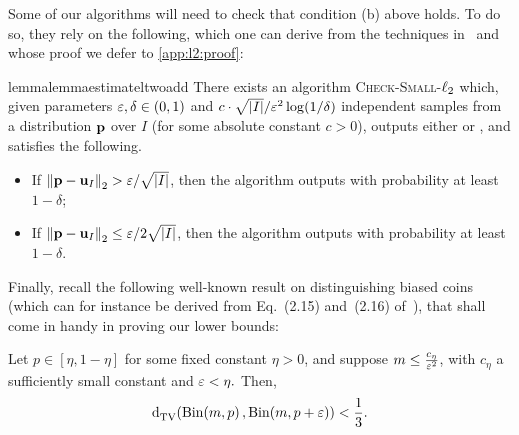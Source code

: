 \noindent Some of our algorithms will need to check that condition \textsf{(b)} above holds. To do so, they rely on the following, which one can derive from the techniques in~\cite{DKN:15} and whose proof we defer to \cref{app:l2:proof}:
\begin{restatable}{lemma}{lemmaestimateltwoadd}\label{lemma:estimate:l2:add}
There exists an algorithm \textsc{Check-Small-$\lp[2]$} which, given parameters $\eps,\delta\in(0,1)$ and $c\cdot{\sqrt{\abs{I}}}/{\eps^2} \log(1/\delta)$ independent samples from a distribution $\D$ over $I$ (for some absolute constant $c>0$), outputs either \yes or \no, and satisfies the following.
  \begin{itemize}
    \item If $\normtwo{\D-\uniform_I} > {\eps}/{\sqrt{\abs{I}}}$, then the algorithm outputs \no with probability at least $1-\delta$;
    \item If $\normtwo{\D-\uniform_I} \leq {\eps}/{2\sqrt{\abs{I}}}$, then the algorithm outputs \yes with probability at least $1-\delta$.
  \end{itemize}
\end{restatable}

Finally, recall the following well-known result on distinguishing biased coins (which can for instance be derived from Eq.~(2.15) and~(2.16) of~\cite{AdellJodra:06}), that shall come in handy in proving our lower bounds:
\begin{fact}\label{fact:fair:biased:coin}
Let $p\in[\eta, 1-\eta]$ for some fixed constant $\eta > 0$, and suppose $m\leq\frac{c_\eta}{\eps^2}$, with $c_\eta$ a sufficiently small constant
and $\eps < \eta.$ Then,
\[ \totalvardist{ \binomial{m}{p} }{ \binomial{m}{p+\eps} } < \frac{1}{3}. \]
\end{fact}


